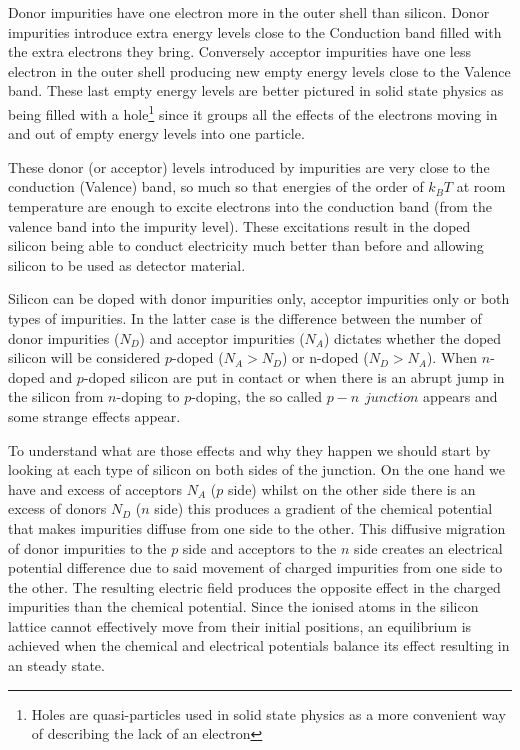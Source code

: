 Donor impurities have one electron more in the outer shell than silicon. Donor impurities introduce extra energy levels close to the Conduction band filled with the extra electrons they bring. Conversely acceptor impurities have one less electron in the outer shell producing new empty energy levels close to the Valence band. These last empty energy levels are better pictured in solid state physics as being filled with a hole\footnote{Holes are quasi-particles used in solid state physics as a more convenient way of describing the lack of an electron} since it groups all the effects of the electrons moving in and out of empty energy levels into one particle.

These donor (or acceptor) levels introduced by impurities are very close to the conduction (Valence) band, so much so that energies of the order of $k_B T$ at room temperature are enough to excite electrons into the conduction band (from the valence band into the impurity level). These excitations result in the doped silicon being able to conduct electricity much better than before and allowing silicon to be used as detector material.

Silicon can be doped with donor impurities only, acceptor impurities only or both types of impurities. In the latter case is the difference between the number of donor impurities ($N_D$) and acceptor impurities ($N_A$) dictates whether the doped silicon will be considered $p$-doped ($N_A > N_D $) or n-doped ($N_D > N_A$). When $n$-doped and $p$-doped silicon are put in contact or when there is an abrupt jump in the silicon from $n$-doping to $p$-doping, the so called $p-n \hspace{5pt} junction$ appears and some strange effects appear.

To understand what are those effects and why they happen we should start by looking at each type of silicon on both sides of the junction. On the one hand we have and excess of acceptors $N_A$ ($p$ side) whilst on the other side there is an excess of donors $N_D$ ($n$ side) this produces a gradient of the chemical potential that makes impurities diffuse from one side to the other. This diffusive migration of donor impurities to the $p$ side and acceptors to the $n$ side creates an electrical potential difference due to said movement of charged impurities from one side to the other. The resulting electric field produces the opposite effect in the charged impurities than the chemical potential. Since the ionised atoms in the silicon lattice cannot effectively move from their initial positions, an equilibrium is achieved when the chemical and electrical potentials balance its effect resulting in an steady state. 


